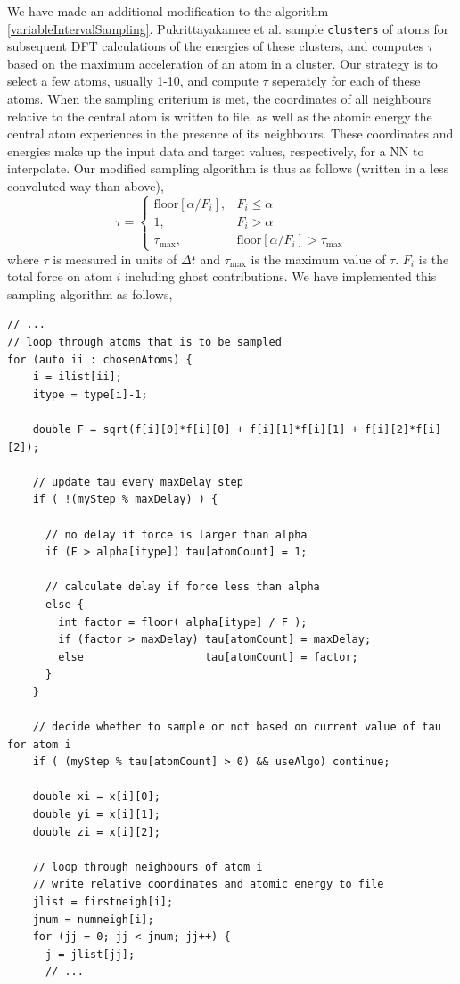 \documentclass[twoside,english]{uiofysmaster}
\begin{document}
We have made an additional modification to the algorithm \eqref{variableIntervalSampling}.  
Pukrittayakamee et al. \cite{Pukrittayakamee09} sample \texttt{clusters} of atoms for subsequent DFT calculations
of the energies of these clusters, and computes $\tau$ based on the maximum acceleration of an atom in a cluster. 
Our strategy is to select a few atoms, usually 1-10, and compute $\tau$ seperately for each of these atoms. When 
the sampling criterium is met, the coordinates of all neighbours relative to the central atom is written to file, 
as well as the atomic energy the central atom experiences in the presence of its neighbours. These coordinates
and energies make up the input data and target values, respectively, for a NN to interpolate. 
Our modified sampling algorithm is thus as follows (written in a less convoluted way than above),
\begin{equation}
 \tau = 
\begin{cases}
  \textrm{floor}\left[\alpha/F_i\right], &F_i \leq \alpha \\
  1, &F_i > \alpha \\
  \tau_\textrm{max}, &\textrm{floor}\left[\alpha/F_i\right] > \tau_\textrm{max}
\end{cases}
\label{samplingAlgorithmModified}
\end{equation}
where $\tau$ is measured in units of $\Delta t$ and $\tau_\textrm{max}$ is the maximum value of $\tau$.
$F_i$ is the total force on atom $i$ including ghost contributions. 
We have implemented this sampling algorithm as follows,
\begin{listing}[H]
\begin{verbatim}
// ...
// loop through atoms that is to be sampled
for (auto ii : chosenAtoms) {
    i = ilist[ii];
    itype = type[i]-1;

    double F = sqrt(f[i][0]*f[i][0] + f[i][1]*f[i][1] + f[i][2]*f[i][2]);

    // update tau every maxDelay step
    if ( !(myStep % maxDelay) ) {

      // no delay if force is larger than alpha
      if (F > alpha[itype]) tau[atomCount] = 1;

      // calculate delay if force less than alpha
      else {
        int factor = floor( alpha[itype] / F );
        if (factor > maxDelay) tau[atomCount] = maxDelay;
        else                   tau[atomCount] = factor;
      }
    }

    // decide whether to sample or not based on current value of tau for atom i
    if ( (myStep % tau[atomCount] > 0) && useAlgo) continue;

    double xi = x[i][0];
    double yi = x[i][1];
    double zi = x[i][2];
    
    // loop through neighbours of atom i 
    // write relative coordinates and atomic energy to file
    jlist = firstneigh[i];
    jnum = numneigh[i];
    for (jj = 0; jj < jnum; jj++) {
      j = jlist[jj];
      // ...
\end{verbatim}
\end{listing}
\end{document}
